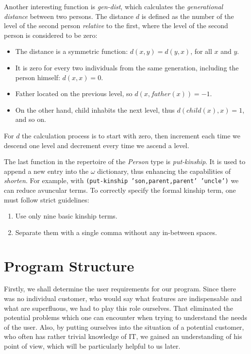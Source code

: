     Another interesting function is \textit{gen-dist}, which calculates the \textit{generational distance} between two persons.
    The distance $d$ is defined as the number of the level of the second person \textit{relative} to the first, where the level of the
    second person is considered to be zero:
    \begin{itemize}
        \item{The distance is a symmetric function: $d(x, y) = d(y, x)$, for all $x$ and $y$.}
        \item{It is zero for every two individuals from the same generation, including the person himself: $d(x, x) = 0$.}
        \item{Father located on the previous level, so $d(x, father(x)) = -1$.}
        \item{On the other hand, child inhabits the next level, thus $d(child(x), x) = 1$, and so on.}
    \end{itemize}
    For $d$ the calculation process is to start with zero, then increment each time we descend one level and decrement every time we
    ascend a level.

    The last function in the repertoire of the \textit{Person} type is \textit{put-kinship}. It is used to append a new entry
    into the $\omega$ dictionary, thus enhancing the capabilities of \textit{shorten}. For example, with \texttt{(put-kinship
    'son,parent,parent' 'uncle')} we can reduce avuncular terms. To correctly specify the formal kinship term, one must follow strict
    guidelines:
    \begin{enumerate}
        \item{Use only nine basic kinship terms.}
        \item{Separate them with a single comma without any in-between spaces.}
    \end{enumerate}

\section{Program Structure}
    Firstly, we shall determine the user requirements for our program. Since there was no individual customer, who would say what
    features are indispensable and what are superfluous, we had to play this role ourselves. That eliminated the potential problems
    which one can encounter when trying to understand the needs of the user. Also, by putting ourselves into the situation of a
    potential customer, who often has rather trivial knowledge of IT, we gained an understanding of his point of view, which will be
    particularly helpful to us later.

